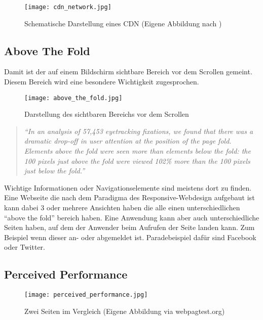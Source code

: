 		\begin{figure}[htbp]
			\begin{center}
				\texttt{[image: cdn\_network.jpg]}
				\caption{Schematische Darstellung eines CDN (Eigene Abbildung nach \autocite{ritz14})}
				\label{fig:cdn_network}
			\end{center}
		\end{figure}
		


	\subsection{Above The Fold} %
	\label{sub:above_the_fold}
		Damit ist der auf einem Bildschirm sichtbare Bereich vor dem Scrollen gemeint. Diesem Bereich wird eine besondere Wichtigkeit zugesprochen.
		\begin{figure}[htbp]
			\begin{center}
				\texttt{[image: above\_the\_fold.jpg]}
				\caption{Darstellung des sichtbaren Bereichs vor dem Scrollen}
				\label{fig:above_the_fold}
			\end{center}
		\end{figure}

		\begin{quote}
			 \textit{"`In an analysis of 57,453 eyetracking fixations, we found that there was a dramatic drop-off in user attention at the position of the page fold. Elements above the fold were seen more than elements below the fold: the 100 pixels just above the fold were viewed 102\% more than the 100 pixels just below the fold."'} \autocite{nng15}
		\end{quote}

		Wichtige Informationen oder Navigationselemente sind meistens dort zu finden. Eine Webseite die nach dem Paradigma des Responsive-Webdesign aufgebaut ist kann dabei 3 oder mehrere Ansichten haben die alle einen unterschiedlichen "`above the fold"' bereich haben. Eine Anwendung kann aber auch unterschiedliche Seiten haben, auf dem der Anwender beim Aufrufen der Seite landen kann. Zum Beispiel wenn dieser an- oder abgemeldet ist. Paradebeispiel dafür sind Facebook oder Twitter.

		\pagebreak




	\subsection{Perceived Performance} %
	\label{sub:perceived_performance}
		\begin{figure}[htbp]
			\begin{center}
				\texttt{[image: perceived\_performance.jpg]}
				\caption{Zwei Seiten im Vergleich (Eigene Abbildung via webpagtest.org)}
				\label{fig:perceived_performance}
			\end{center}
		\end{figure}

